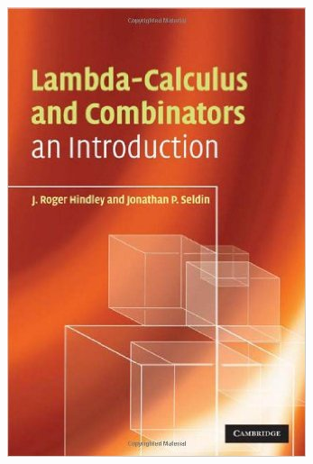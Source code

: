 \documentclass[pdf]{beamer}
\begin{document}
\begin{frame}
\begin{itemize}
\begin{figure}[!tbp]
\begin{minipage}[b]{0.15\textwidth}
        \includegraphics[width=\textwidth]{libro-hindley.jpg}
      \end{minipage}
      \hfill
      \begin{minipage}[b]{0.15\textwidth}

\end{minipage}
\end{figure}
\end{itemize}
\end{frame}
\end{document}
